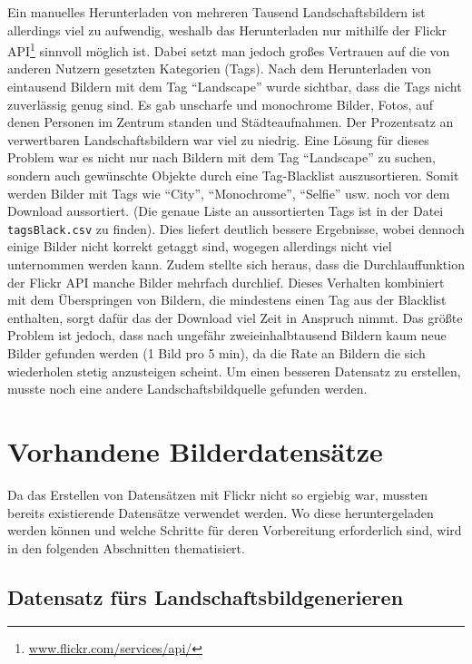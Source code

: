 Ein manuelles Herunterladen von mehreren Tausend Landschaftsbildern ist
allerdings viel zu aufwendig, weshalb das Herunterladen nur mithilfe der Flickr
API\footnote{\url{www.flickr.com/services/api/}} sinnvoll möglich ist. Dabei setzt man jedoch großes Vertrauen auf die von anderen
Nutzern gesetzten Kategorien (Tags). Nach dem Herunterladen von eintausend
Bildern mit dem Tag \enquote{Landscape} wurde sichtbar, dass die Tags nicht
zuverlässig genug sind. Es gab unscharfe und monochrome Bilder, Fotos, auf denen
Personen im Zentrum standen und Städteaufnahmen. Der Prozentsatz an verwertbaren
Landschaftsbildern war viel zu niedrig. Eine Lösung für dieses Problem war es
nicht nur nach Bildern mit dem Tag  \enquote{Landscape} zu suchen, sondern auch
gewünschte Objekte durch eine Tag-Blacklist auszusortieren. Somit werden Bilder
mit Tags wie \enquote{City}, \enquote{Monochrome}, \enquote{Selfie} usw. noch
vor dem Download aussortiert. (Die genaue Liste an aussortierten Tags ist in der
Datei \texttt{tagsBlack.csv} zu finden). Dies liefert deutlich bessere
Ergebnisse, wobei dennoch einige Bilder nicht korrekt getaggt sind, wogegen
allerdings nicht viel unternommen werden kann. Zudem stellte sich heraus, dass
die Durchlauffunktion der Flickr API manche Bilder mehrfach durchlief. Dieses
Verhalten kombiniert mit dem Überspringen von Bildern, die mindestens einen Tag
aus der Blacklist enthalten, sorgt dafür das der Download viel Zeit in Anspruch
nimmt. Das größte Problem ist jedoch, dass nach ungefähr zweieinhalbtausend
Bildern kaum neue Bilder gefunden werden (1 Bild pro 5 min), da die Rate an
Bildern die sich wiederholen stetig anzusteigen scheint. Um einen besseren
Datensatz zu erstellen, musste noch eine andere Landschaftsbildquelle gefunden
werden.

\section{Vorhandene Bilderdatensätze}%

Da das Erstellen von Datensätzen mit Flickr nicht so ergiebig war, mussten
bereits existierende Datensätze verwendet werden. Wo diese heruntergeladen
werden können und welche Schritte für deren Vorbereitung erforderlich sind, wird
in den folgenden Abschnitten thematisiert. 

\subsection{Datensatz fürs Landschaftsbildgenerieren}

